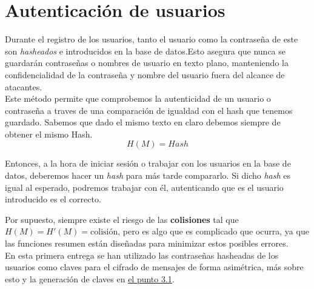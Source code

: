 \documentclass[a4paper,11pt]{article}
\begin{document}
\vspace{0.5cm}



\section{Autenticación de usuarios}
\label{sec:autenticacionUsuarios}
Durante el registro de los usuarios, tanto el usuario como la contraseña de este
son \textit{hasheados} e introducidos en la base de datos.Esto asegura que nunca
se guardarán contraseñas o nombres de usuario en texto plano, manteniendo la
confidencialidad de la contraseña y nombre del usuario fuera del alcance de atacantes.
\\
Este método permite que comprobemos la autenticidad de un usuario o
contraseña a traves de una comparación de igualdad con el hash que tenemos
guardado. Sabemos que dado el mismo texto en claro debemos siempre de obtener el
mismo Hash.
$$H(M) = Hash$$

Entonces, a la hora de iniciar sesión o trabajar con los usuarios en la base de datos, deberemos hacer un \textit{hash} para más tarde compararlo. Si dicho \textit{hash} es igual al esperado, podremos trabajar con él, autenticando que es el usuario introducido es el correcto.

Por supuesto, siempre existe el riesgo de las \textbf{colisiones} tal que $H(M) = H'(M) = \text{colisión}$, pero es algo que es complicado que ocurra, ya que las funciones resumen están diseñadas para minimizar estos posibles errores.\\ 

En esta primera entrega se han utilizado las contraseñas hasheadas de los usuarios como claves para el cifrado de mensajes de forma asimétrica, más sobre esto y la generación de claves en \hyperref[sec:generacionUsoDeClaves]{el punto 3.1}.
\end{document}
